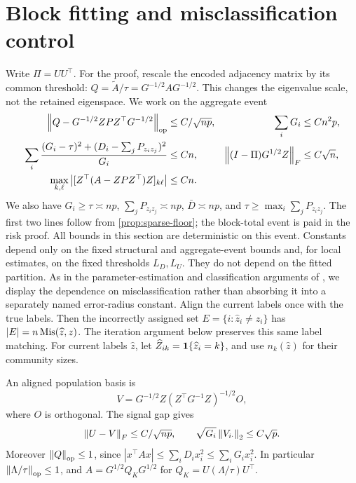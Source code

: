 \section{Block fitting and misclassification control}
\label{restore:fit}

Write $\Pi=UU^\top$. For the
proof, rescale the encoded adjacency matrix by its common threshold:
$Q=\widetilde A/\tau=G^{-1/2}AG^{-1/2}$. This changes the eigenvalue scale,
not the retained eigenspace. We work on the aggregate event
\begin{align}
 \left\lVert Q-G^{-1/2}{ZPZ^\top} G^{-1/2}\right\rVert_{\mathrm{op}}
   &\le C/\sqrt {np},& \sum_iG_i&\le C{n^2p},
 \label{restore:fit-geometry-one}\\
 \sum_i\frac{(G_i-\tau)^2+(D_i-\sum_jP_{z_i z_j})^2}{G_i}
   &\le Cn,&
 \left\lVert(I-\Pi)G^{1/2}Z\right\rVert_F&\le C\sqrt n,
 \label{restore:fit-geometry-two}\\
 \max_{k,\ell}\left|[Z^\top(A-{ZPZ^\top})Z]_{k\ell}\right|
   &\le Cn.&&\label{restore:fit-block-event}
\end{align}
We also have $G_i\ge\tau\asymp {np}$, $\sum_jP_{z_i z_j}\asymp {np}$,
$\bar D\asymp {np}$, and $\tau\ge\max_i\sum_jP_{z_i z_j}$. The first two
lines follow from \cref{prop:sparse-floor}; the block-total event is
paid in the risk proof. All bounds in this section are deterministic
on this event. Constants depend only on the fixed structural and
aggregate-event bounds and, for local estimates, on the fixed thresholds
$L_D,L_U$. They do not depend on the fitted partition. As in the
parameter-estimation and classification arguments of \citet{zhouli}, we display the dependence on misclassification rather
than absorbing it into a separately named error-radius constant.
Align the current labels once with the true labels. Then the incorrectly
assigned set $E=\{i:\widehat z_i\ne z_i\}$ has
$|E|=n\operatorname{Mis}(\widehat z,z)$. The iteration argument below preserves this
same label matching.
For current labels $\widehat z$, let
$\widehat Z_{ik}=\mathbf1\{\widehat z_i=k\}$, and use
$n_k(\widehat z)$ for their community sizes.

An aligned population basis is
\[
 V=G^{-1/2}Z(Z^\top G^{-1}Z)^{-1/2}O,
\]
where $O$ is orthogonal. The signal gap gives
\begin{equation}\label{restore:fit-basis}
 \left\lVert U-V\right\rVert_F\le C/\sqrt {np},\qquad
 \sqrt{G_i}\left\lVert V_{i\cdot}\right\rVert_2\le C\sqrt{p}.
\end{equation}
Moreover $\left\lVert Q\right\rVert_{\mathrm{op}}\le1$, since
$|x^\top Ax|\le\sum_iD_ix_i^2\le\sum_iG_ix_i^2$.
In particular $\left\lVert\Lambda/\tau\right\rVert_{\mathrm{op}}\le1$, and
$\widehat A=G^{1/2}Q_KG^{1/2}$ for $Q_K=U(\Lambda/\tau)U^\top$.

